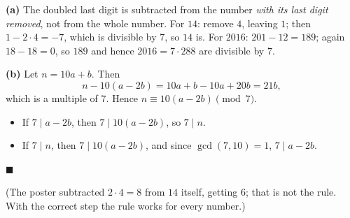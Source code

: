 \textbf{(a)} The doubled last digit is subtracted from the number \emph{with its last digit removed}, not from the whole number. For $14$: remove $4$, leaving $1$; then $1-2\cdot4=-7$, which is divisible by $7$, so $14$ is. For $2016$: $201-12=189$; again $18-18=0$, so $189$ and hence $2016=7\cdot288$ are divisible by $7$.

\textbf{(b)} Let $n=10a+b$. Then
\[
n-10(a-2b)=10a+b-10a+20b=21b ,
\]
which is a multiple of $7$. Hence $n\equiv10(a-2b)\pmod 7$.
\begin{itemize}
\item If $7\mid a-2b$, then $7\mid10(a-2b)$, so $7\mid n$.
\item If $7\mid n$, then $7\mid10(a-2b)$, and since $\gcd(7,10)=1$, $7\mid a-2b$.
\end{itemize}
$\blacksquare$

(The poster subtracted $2\cdot4=8$ from $14$ itself, getting $6$; that is not the rule. With the correct step the rule works for every number.)
